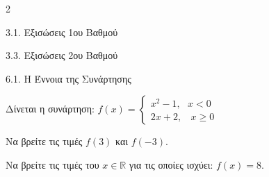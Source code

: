 \begin{ylh}{2}
    \item 3.1. Εξισώσεις 1ου Βαθμού
    \item 3.3. Εξισώσεις 2ου Βαθμού
    \item 6.1. Η Έννοια της Συνάρτησης
\end{ylh}
Δίνεται η συνάρτηση: \(f(x) = \left\{ \begin{array}{r}
x^{2} - 1,\ \ \ x < 0 \\
2x + 2,\ \ \ \ x \geq 0
\end{array} \right.\ \)

\begin{alist}
\item Να βρείτε τις τιμές $f(3)$ και $f( - 3)$.
\item Να βρείτε τις τιμές του $x\mathbb{\in R}$ για τις οποίες ισχύει: $f(x) = 8$.

\end{alist}


